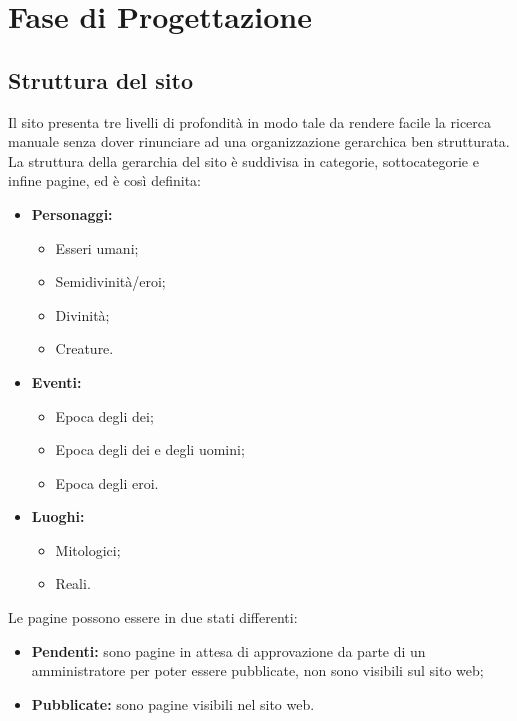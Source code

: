 \section{Fase di Progettazione}

\subsection{Struttura del sito}
Il sito presenta tre livelli di profondità in modo tale da rendere facile la ricerca manuale senza dover rinunciare ad una organizzazione gerarchica ben strutturata.\\
La struttura della gerarchia del sito è suddivisa in categorie, sottocategorie e infine pagine, ed è così definita:
\begin{itemize}
	\item \textbf{Personaggi:}
	\begin{itemize}
		\item Esseri umani;
		\item Semidivinità/eroi;
		\item Divinità;
		\item Creature.
	\end{itemize}
	\item \textbf{Eventi:}
	\begin{itemize}
		\item Epoca degli dei;
		\item Epoca degli dei e degli uomini;
		\item Epoca degli eroi.
	\end{itemize}
	\item \textbf{Luoghi:}
	\begin{itemize}
		\item Mitologici;
		\item Reali.
	\end{itemize}
\end{itemize}
Le pagine possono essere in due stati differenti:
\begin{itemize}
	\item \textbf{Pendenti:} sono pagine in attesa di approvazione da parte di un amministratore per poter essere pubblicate, non sono visibili sul sito web;
	\item \textbf{Pubblicate:} sono pagine visibili nel sito web.
\end{itemize}


